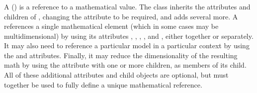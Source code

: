\subsubsection{}
\label{class:variable}
A \Variable () is a reference to a mathematical value.  The \Variable class inherits the attributes and children of \SEDBase, changing the attribute  to be required, and adds several more.  A \Variable references a single mathematical element (which in some cases may be multidimensional) by using its attributes , , , , and , either together or separately.  It may also need to reference a particular model in a particular context by using the  and  attributes.  Finally, it may reduce the dimensionality of the resulting math by using the  attribute with one or more \AppliedDimension children, as members of its \ListOfAppliedDimensions child.  All of these additional attributes and child objects are optional, but must together be used to fully define a unique mathematical reference.


